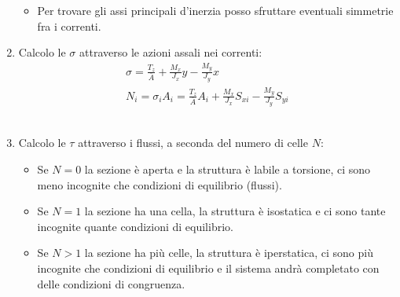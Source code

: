 \begin{enumerate}
\begin{itemize}
    \item Per trovare gli assi principali d'inerzia posso sfruttare eventuali simmetrie fra i correnti.
    \end{itemize}
    \item Calcolo le $\sigma$ attraverso le azioni assali nei correnti:
    \begin{align*}
        \sigma = \frac{T_z}{\bar{A}} +  \frac{M_x}{J_x}y -\frac{M_y}{J_y}x \\
        N_i = \sigma_iA_i= \frac{T_z}{\bar{A}}A_i +  \frac{M_x}{J_x}S_{xi} -\frac{M_y}{J_y}S_{yi}
     \end{align*}\\
    \item Calcolo le $\tau$ attraverso i flussi, a seconda del numero di celle $N$:
    \begin{itemize}
        \item Se $N=0$ la sezione è aperta e la struttura è labile a torsione, ci sono meno incognite che condizioni di equilibrio (flussi).\\
        \item Se $N=1$ la sezione ha una cella, la struttura è isostatica e ci sono tante incognite quante condizioni di equilibrio.\\
        \item Se $N>1$ la sezione ha più celle, la struttura è iperstatica, ci sono più incognite che condizioni di equilibrio e il sistema andrà completato con delle condizioni di congruenza.
    \end{itemize}
\end{enumerate}


